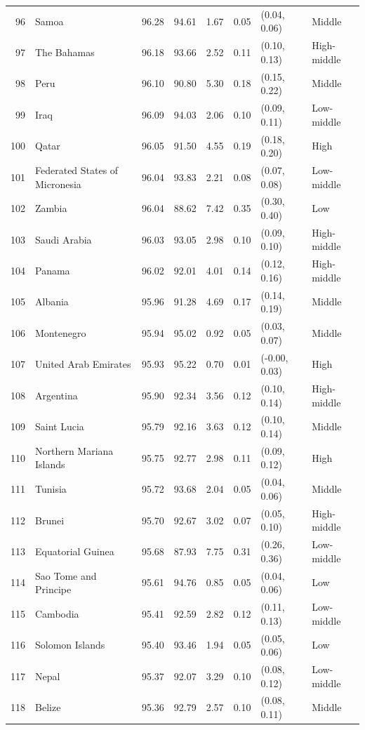 \begin{longtable}{r l r r r r l l}
96 & Samoa & 96.28 & 94.61 & 1.67 & 0.05 & (0.04, 0.06) & Middle \\
97 & The Bahamas & 96.18 & 93.66 & 2.52 & 0.11 & (0.10, 0.13) & High-middle \\
98 & Peru & 96.10 & 90.80 & 5.30 & 0.18 & (0.15, 0.22) & Middle \\
99 & Iraq & 96.09 & 94.03 & 2.06 & 0.10 & (0.09, 0.11) & Low-middle \\
100 & Qatar & 96.05 & 91.50 & 4.55 & 0.19 & (0.18, 0.20) & High \\
101 & Federated States of Micronesia & 96.04 & 93.83 & 2.21 & 0.08 & (0.07, 0.08) & Low-middle \\
102 & Zambia & 96.04 & 88.62 & 7.42 & 0.35 & (0.30, 0.40) & Low \\
103 & Saudi Arabia & 96.03 & 93.05 & 2.98 & 0.10 & (0.09, 0.10) & High-middle \\
104 & Panama & 96.02 & 92.01 & 4.01 & 0.14 & (0.12, 0.16) & High-middle \\
105 & Albania & 95.96 & 91.28 & 4.69 & 0.17 & (0.14, 0.19) & Middle \\
106 & Montenegro & 95.94 & 95.02 & 0.92 & 0.05 & (0.03, 0.07) & Middle \\
107 & United Arab Emirates & 95.93 & 95.22 & 0.70 & 0.01 & (-0.00, 0.03) & High \\
108 & Argentina & 95.90 & 92.34 & 3.56 & 0.12 & (0.10, 0.14) & High-middle \\
109 & Saint Lucia & 95.79 & 92.16 & 3.63 & 0.12 & (0.10, 0.14) & Middle \\
110 & Northern Mariana Islands & 95.75 & 92.77 & 2.98 & 0.11 & (0.09, 0.12) & High \\
111 & Tunisia & 95.72 & 93.68 & 2.04 & 0.05 & (0.04, 0.06) & Middle \\
112 & Brunei & 95.70 & 92.67 & 3.02 & 0.07 & (0.05, 0.10) & High-middle \\
113 & Equatorial Guinea & 95.68 & 87.93 & 7.75 & 0.31 & (0.26, 0.36) & Low-middle \\
114 & Sao Tome and Principe & 95.61 & 94.76 & 0.85 & 0.05 & (0.04, 0.06) & Low \\
115 & Cambodia & 95.41 & 92.59 & 2.82 & 0.12 & (0.11, 0.13) & Low-middle \\
116 & Solomon Islands & 95.40 & 93.46 & 1.94 & 0.05 & (0.05, 0.06) & Low \\
117 & Nepal & 95.37 & 92.07 & 3.29 & 0.10 & (0.08, 0.12) & Low-middle \\
118 & Belize & 95.36 & 92.79 & 2.57 & 0.10 & (0.08, 0.11) & Middle \\

\end{longtable}
